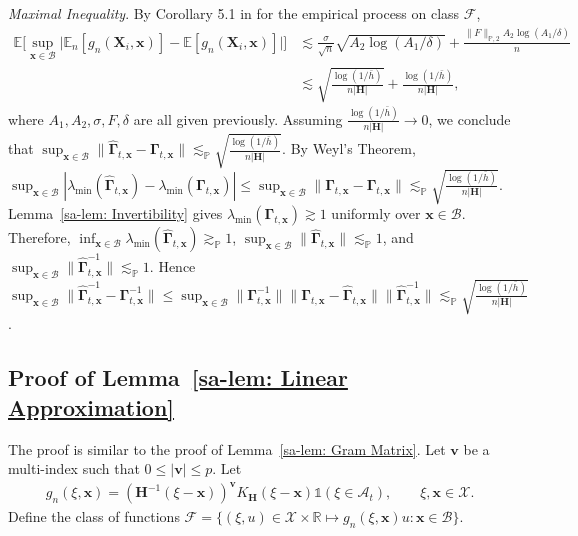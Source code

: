 \documentclass[10pt]{article}
\renewcommand{\P}{\mathbb{P}}
\newcommand{\E}{\mathbb{E}}
\newcommand{\Indicator}{\mathds{1}}
\newcommand{\En}{\mathbb{E}_n}
\newcommand{\reals}{\mathbb{R}}
\newcommand{\lessp}{\lesssim_{\mathbb{P}}}
\newcommand{\pnorm}[1]{\lVert #1 \rVert_{\mathbb{P},2}}
\newcommand{\bH}{\mathbf{H}}
\newcommand{\bv}{\mathbf{v}}
\newcommand{\bx}{\mathbf{x}}
\newcommand{\bX}{\mathbf{X}}
\newcommand{\bGamma}{\boldsymbol{\Gamma}}
\newcommand{\A}{\mathcal{A}}
\newcommand{\B}{\mathcal{B}}
\newcommand{\F}{\mathcal{F}}
\newcommand{\X}{\mathcal{X}}
\begin{document}
\medskip\textit{Maximal Inequality}. By Corollary 5.1 in \cite{Chernozhukov-Chetverikov-Kato_2014b_AoS} for the empirical process on class $\F$,
\begin{align*}
     \E \Big[\sup_{\bx \in \B} \big|\En [g_n(\bX_i, \bx)]  - \E[g_n(\bX_i, \bx)]\big| \Big]
    & \lesssim \frac{\sigma}{\sqrt{n}}\sqrt{A_2\log(A_1/\delta)} + \frac{\pnorm{F} A_2\log(A_1/\delta)}{n} \\
    & \lesssim \sqrt{\frac{\log(1/\bar{h})}{n |\bH|}} + \frac{\log(1/\bar{h})}{n |\bH|},
\end{align*}
where $A_1, A_2, \sigma, F, \delta$ are all given previously. Assuming $\frac{\log(1/\bar{h})}{n |\bH|} \to 0$, we conclude that $\sup_{\bx \in \B} \big\|\widehat{\bGamma}_{t,\bx} - \bGamma_{t,\bx}\big\| \lessp \sqrt{\frac{\log(1/\bar{h})}{n |\bH|}}$. By Weyl's Theorem, $\sup_{\bx \in \B}|\lambda_{\min}(\widehat{\bGamma}_{t,\bx}) - \lambda_{\min}(\bGamma_{t,\bx})| \leq \sup_{\bx \in \B} \big\|\widehat{\bGamma}_{t,\bx} - \bGamma_{t,\bx}\big\| \lessp \sqrt{\frac{\log(1/\bar{h})}{n |\bH| }}$. Lemma~\ref{sa-lem: Invertibility} gives $\lambda_{\min}(\bGamma_{t,\bx}) \gtrsim 1$ uniformly over $\bx\in\B$. Therefore, $\inf_{\bx \in \B}\lambda_{\min}(\widehat{\bGamma}_{t,\bx}) \gtrsim_{\P} 1$, $\sup_{\bx \in \B} \big\|\widehat{\bGamma}_{t,\bx}\big\| \lessp 1$, and $\sup_{\bx \in \B} \big\|\widehat{\bGamma}_{t,\bx}^{-1}\big\| \lessp 1$. Hence $\sup_{\bx \in \B} \big\|\widehat{\bGamma}_{t,\bx}^{-1} - \bGamma_{t,\bx}^{-1}\big\| \leq \sup_{\bx \in \B} \big\|\bGamma_{t,\bx}^{-1}\big\| \big\|\bGamma_{t,\bx} -\widehat{\bGamma}_{t,\bx}\big\| \big\|\widehat{\bGamma}_{t,\bx}^{-1}\big\| \lessp \sqrt{\frac{\log(1/\bar{h})}{n |\bH|}}$.


\subsection{Proof of Lemma~\ref{sa-lem: Linear Approximation}}

The proof is similar to the proof of Lemma~\ref{sa-lem: Gram Matrix}. Let $\bv$ be a multi-index such that $ 0 \leq |\bv| \leq p$. Let
\begin{align*}
    g_n(\xi,\bx) = (\bH^{-1}(\xi - \bx))^{\bv} K_{\bH}(\xi - \bx)\Indicator(\xi\in \A_t), \qquad \xi , \bx \in \X.
\end{align*}
Define the class of functions $\F = \{(\xi, u) \in \X \times \reals \mapsto g_n(\xi,\bx)u: \bx \in \B\}$.
\end{document}
